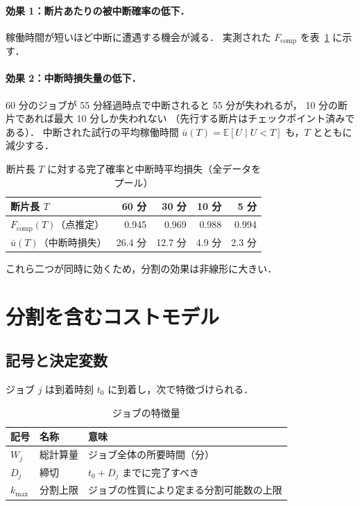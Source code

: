 \documentclass[11pt,a4paper]{ltjsreport}
\newcommand{\Fcomp}{F_{\mathrm{comp}}}
\newcommand{\E}{\mathbb{E}}
\begin{document}
\paragraph{効果 1：断片あたりの被中断確率の低下．}
稼働時間が短いほど中断に遭遇する機会が減る．
実測された $\Fcomp$ を表~\ref{tab:split_effect} に示す．

\paragraph{効果 2：中断時損失量の低下．}
60 分のジョブが 55 分経過時点で中断されると 55 分が失われるが，
10 分の断片であれば最大 10 分しか失われない
（先行する断片はチェックポイント済みである）．
中断された試行の平均稼働時間
$\bar u(T) = \E[U \mid U < T]$ も，$T$ とともに減少する．

\begin{table}[htbp]
\centering
\caption{断片長 $T$ に対する完了確率と中断時平均損失（全データをプール）}
\label{tab:split_effect}
\small
\begin{tabular}{@{}lrrrr@{}}
\toprule
断片長 $T$ & 60 分 & 30 分 & 10 分 & 5 分 \\
\midrule
$\Fcomp(T)$（点推定）   & 0.945 & 0.969 & 0.988 & 0.994 \\
$\bar u(T)$（中断時損失） & 26.4 分 & 12.7 分 & 4.9 分 & 2.3 分 \\
\bottomrule
\end{tabular}
\end{table}

これら二つが同時に効くため，分割の効果は非線形に大きい．

\section{分割を含むコストモデル}

\subsection{記号と決定変数}

ジョブ $j$ は到着時刻 $t_0$ に到着し，次で特徴づけられる．

\begin{table}[htbp]
\centering
\caption{ジョブの特徴量}
\label{tab:job}
\small
\begin{tabularx}{\textwidth}{@{}llX@{}}
\toprule
記号 & 名称 & 意味 \\
\midrule
$W_j$      & 総計算量 & ジョブ全体の所要時間（分） \\
$D_j$      & 締切     & $t_0 + D_j$ までに完了すべき \\
$k_{\max}$ & 分割上限 & ジョブの性質により定まる分割可能数の上限 \\
\bottomrule
\end{tabularx}
\end{table}
\end{document}
